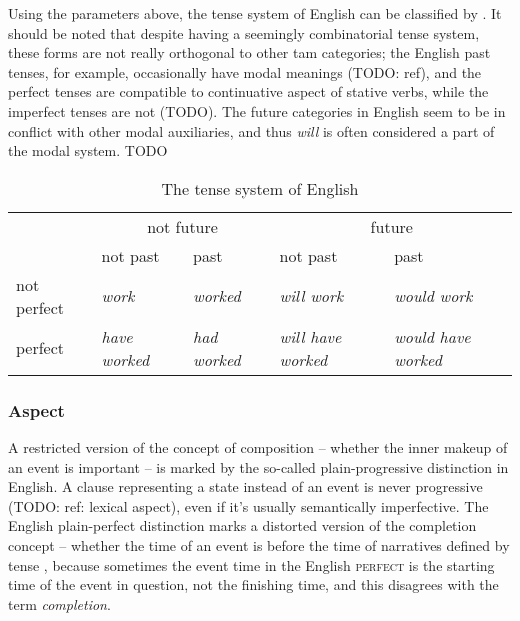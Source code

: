 \documentclass[UTF8, a4paper, oneside, scheme=plain, 12pt]{ctexbook}
\newcommand*{\citesec}[1]{\S~{#1}}
\newcommand*{\term}[1]{\emph{#1}}
\newcommand{\form}[1]{\emph{#1}}
\newcommand{\category}[1]{\textsc{#1}}
\begin{document}
Using the parameters above,
the tense system of English can be classified by .
It should be noted that despite having a seemingly combinatorial tense system,
these forms are not really orthogonal to 
other \acs{tam} categories;
the English past tenses, for example, 
occasionally have modal meanings (TODO: ref),
and the perfect tenses are compatible to continuative aspect 
of stative verbs,
while the imperfect tenses are not (TODO).
The future categories in English seem to be in conflict with 
other modal auxiliaries,
and thus \form{will} is often considered a part of the modal system. TODO

\begin{table}[H]
    \caption{The tense system of English}
    \label{tbl:tense}
    \centering
    \begin{tabular}{@{}lllll@{}}
        \toprule
                    & \multicolumn{2}{c}{not future}             & \multicolumn{2}{c}{future}                             \\ \cmidrule(lr){2-3} \cmidrule(l){4-5}
                    & not past             & past                & not past                  & past                       \\ \midrule
        not perfect & \form{work}        & \form{worked}     & \form{will work}        & \form{would work}        \\
        perfect     & \form{have worked} & \form{had worked} & \form{will have worked} & \form{would have worked} \\ \bottomrule
    \end{tabular}
\end{table}

\subsubsection{Aspect}

A restricted version of the concept of composition 
-- whether the inner makeup of an event is important \citep[\citesec{19.10}]{dixon2012basic3} -- 
is marked by the so-called plain-progressive distinction in English.
A clause representing a state instead of an event 
is never progressive (TODO: ref: lexical aspect),
even if it's usually semantically imperfective.
The English plain-perfect distinction marks 
a distorted version of the completion concept 
-- whether the time of an event is before the time of narratives defined by tense 
\citep[\citesec{19.7}]{dixon2012basic3},
because sometimes the event time in the English \category{perfect} 
is the starting time of the event in question,
not the finishing time,
and this disagrees with the term \term{completion}.
\end{document}
